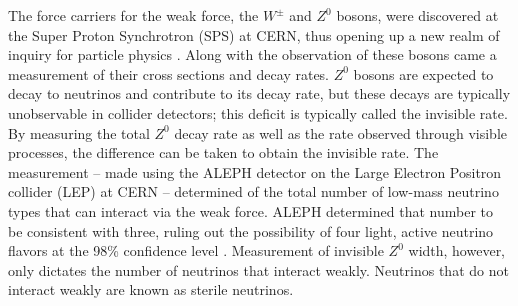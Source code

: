 The force carriers for the weak force, the $W^\pm$ and $Z^0$ bosons, were
discovered at the Super Proton Synchrotron (SPS) at CERN, thus opening up a new
realm of inquiry for particle physics \cite{wBoson, zBoson}.  Along with the
observation of these bosons came a measurement of their cross sections and
decay rates.  $Z^0$ bosons are expected to decay to neutrinos and contribute to
its decay rate, but these decays are typically unobservable in collider
detectors; this deficit is typically called the invisible rate.  By measuring
the total $Z^0$ decay rate as well as the rate observed through visible
processes, the difference can be taken to obtain the invisible rate.  The
measurement -- made using the ALEPH detector on the Large Electron Positron
collider (LEP) at CERN -- determined of the total number of low-mass
neutrino types that can interact via the weak force.
ALEPH determined that number to
be consistent with three, ruling out the possibility of four
light, active neutrino flavors at the 98\% confidence level \cite{aleph}.
Measurement of
invisible $Z^0$ width, however, only dictates the number of neutrinos that
interact weakly.  Neutrinos that do not interact weakly are known as sterile
neutrinos.


